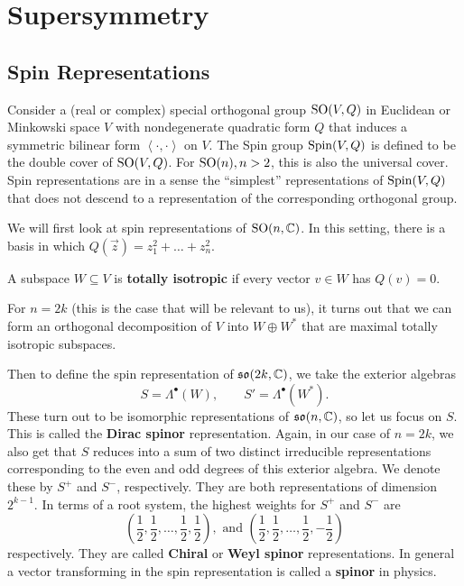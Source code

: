 
	\section{Supersymmetry} %
	\label{sec:supersymmetry}
	\subsection{Spin Representations} %
	\label{sub:spin_representations}

		Consider a (real or complex) special orthogonal group $\mathrm{SO}(V, Q)$ in Euclidean or Minkowski space $V$ with nondegenerate quadratic form $Q$ that induces a symmetric bilinear form $\left < \cdot, \cdot \right>$ on $V$. The Spin group $\mathrm{Spin}(V, Q)$ is defined to be the double cover of $\mathrm{SO}(V, Q)$. For $\mathrm{SO}(n), n > 2$, this is also the universal cover. Spin representations are in a sense the ``simplest'' representations of $\mathrm{Spin}(V, Q)$ that does not descend to a representation of the corresponding orthogonal group. 
		
		We will first look at spin representations of $\mathrm{SO}(n, \mathbb{C})$. In this setting, there is a basis in which $Q(\vec z) = z_1^2 + \dots + z_n^2$. 
		\begin{defn}
			A subspace $W \subseteq V$ is \textbf{totally isotropic} if every vector $v \in W$ has $Q(v) = 0$. 
		\end{defn}
		For $n=2k$ (this is the case that will be relevant to us), it turns out that we can form an orthogonal decomposition of $V$ into $W \oplus W^*$ that are maximal totally isotropic subspaces. 
		
		Then to define the spin representation of $\frak{so}(2k, \mathbb{C})$, we take the exterior algebras
		\[
			S = \Lambda^\bullet (W), \qquad S' = \Lambda^\bullet(W^*).
		\]
		These turn out to be isomorphic representations of $\frak{so}(n, \mathbb{C})$, so let us focus on $S$. This is called the \textbf{Dirac spinor} representation. Again, in our case of $n = 2k$, we also get that $S$ reduces into a sum of two distinct irreducible representations corresponding to the even and odd degrees of this exterior algebra. We denote these by $S^+$ and $S^-$, respectively. They are both representations of dimension $2^{k-1}$. In terms of a root system, the highest weights for $S^+$ and $S^-$ are
		\[
			\left(\frac12, \frac12, \dots, \frac12, \frac12\right), \text{ and } \left(\frac12, \frac12, \dots, \frac12, -\frac12\right)
		\]
		respectively. They are called \textbf{Chiral} or \textbf{Weyl spinor} representations. In general a vector transforming in the spin representation is called a \textbf{spinor} in physics.
		

